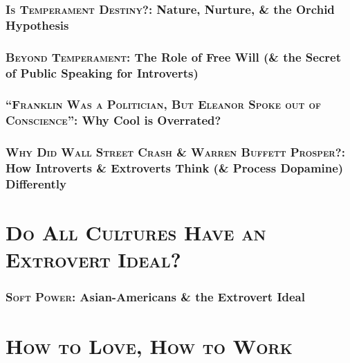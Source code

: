 \documentclass[oneside]{article}
\numberwithin{equation}{section}
\begin{document}
\section{\textsc{Is Temperament Destiny?}: Nature, Nurture, \& the Orchid Hypothesis}


\section{\textsc{Beyond Temperament}: The Role of Free Will (\& the Secret of Public Speaking for Introverts)}


\section{\textsc{``Franklin Was a Politician, But Eleanor Spoke out of Conscience''}: Why Cool is Overrated?}


\section{\textsc{Why Did Wall Street Crash \& Warren Buffett Prosper?}: How Introverts \& Extroverts Think (\& Process Dopamine) Differently}


\part{\textsc{Do All Cultures Have an Extrovert Ideal?}}

\section{\textsc{Soft Power}: Asian-Americans \& the Extrovert Ideal}


\part{\textsc{How to Love, How to Work}}
\end{document}
